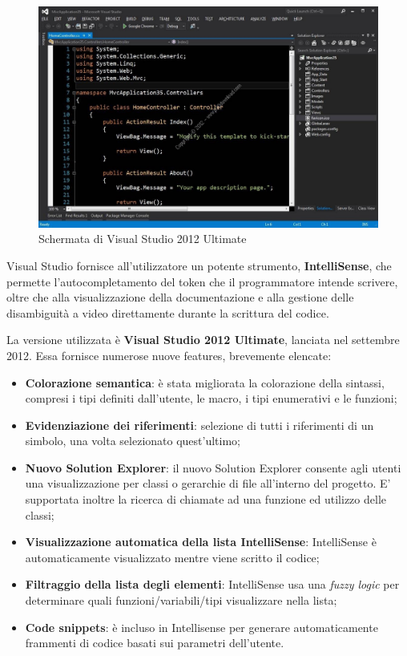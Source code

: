 \begin{figure}
\begin{center}

\includegraphics[scale=0.3]{imgs/visualstudio.jpg} 
\caption{Schermata di Visual Studio 2012 Ultimate\label{vsimage}}
\end{center}

\end{figure}
Visual Studio fornisce all’utilizzatore un potente strumento, \textbf{IntelliSense}, che permette
l'autocompletamento del token che il programmatore intende scrivere, oltre che
alla visualizzazione della documentazione e alla gestione delle disambiguità a
video direttamente durante la scrittura del codice.

La versione utilizzata è \textbf{Visual Studio 2012 Ultimate}, lanciata nel settembre 2012.
Essa fornisce numerose nuove features, brevemente elencate:
\begin{itemize}
\item \textbf{Colorazione semantica}: è stata migliorata la colorazione della sintassi, compresi i tipi definiti dall'utente, le macro, i tipi enumerativi e le funzioni;
\item \textbf{Evidenziazione dei riferimenti}: selezione di tutti i riferimenti di un simbolo, una volta selezionato quest'ultimo;
\item \textbf{Nuovo Solution Explorer}: il nuovo Solution Explorer consente agli utenti una visualizzazione per classi o gerarchie di file all'interno del progetto.
E' supportata inoltre la ricerca di chiamate ad una funzione ed utilizzo delle classi;
\item \textbf{Visualizzazione automatica della lista IntelliSense}: IntelliSense è automaticamente visualizzato mentre viene scritto il codice;
\item \textbf{Filtraggio della lista degli elementi}: IntelliSense usa una \textit{fuzzy logic} per determinare quali funzioni/variabili/tipi visualizzare nella lista;
\item \textbf{Code snippets}: è incluso in Intellisense per generare automaticamente frammenti di codice basati sui parametri dell'utente.
\end{itemize}


